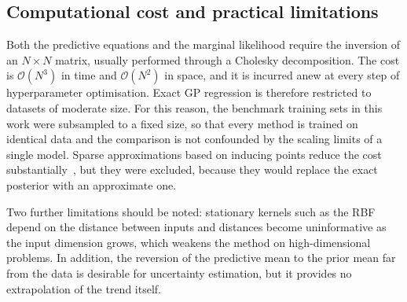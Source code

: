 \subsection{Computational cost and practical limitations}
\label{subsec:gp-limitations}

Both the predictive equations and the marginal likelihood require the inversion of an
$N \times N$ matrix, usually performed through a Cholesky decomposition. The cost is
$\mathcal{O}(N^3)$ in time and $\mathcal{O}(N^2)$ in space, and it is incurred anew at every
step of hyperparameter optimisation. Exact GP regression is therefore restricted to datasets of
moderate size. For this reason, the benchmark training sets in this work were subsampled to a
fixed size, so that every method is trained on identical data and the comparison is not
confounded by the scaling limits of a single model. Sparse approximations based on inducing
points reduce the cost substantially~\cite{quinonero2005}, but they were excluded, because they
would replace the exact posterior with an approximate one.

Two further limitations should be noted: stationary kernels such as the RBF depend on the
distance between inputs and distances become uninformative as the input dimension grows, which
weakens the method on high-dimensional problems. In addition, the reversion of the predictive
mean to the prior mean far from the data is desirable for uncertainty estimation, but it
provides no extrapolation of the trend itself.
